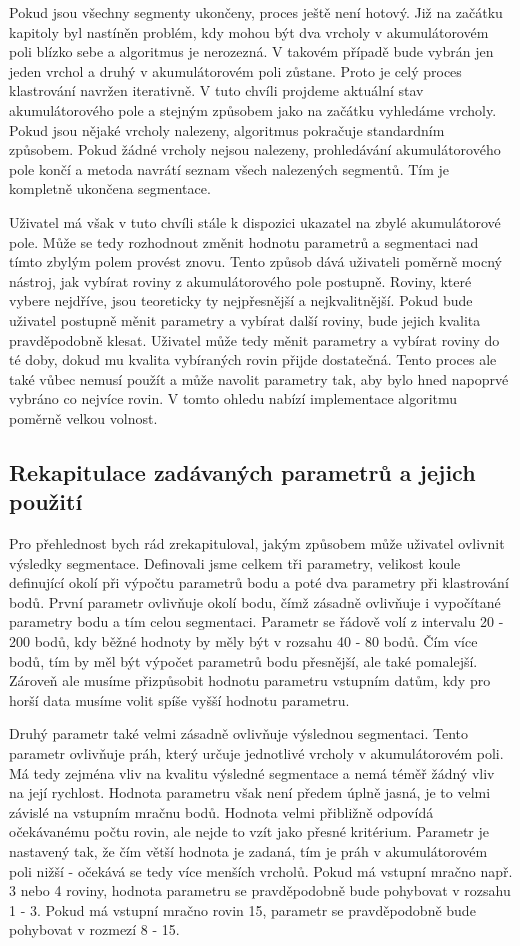 \documentclass[11pt,twoside,a4paper]{book}
\begin{document}
Pokud jsou všechny segmenty ukončeny, proces ještě není hotový. Již na začátku kapitoly byl nastíněn problém, kdy mohou být dva vrcholy v akumulátorovém poli blízko sebe a algoritmus je nerozezná. V takovém případě bude vybrán jen jeden vrchol a druhý v akumulátorovém poli zůstane. Proto je celý proces klastrování navržen iterativně. V tuto chvíli projdeme aktuální stav akumulátorového pole a stejným způsobem jako na začátku vyhledáme vrcholy. Pokud jsou nějaké vrcholy nalezeny, algoritmus pokračuje standardním způsobem. Pokud žádné vrcholy nejsou nalezeny, prohledávání akumulátorového pole končí a metoda navrátí seznam všech nalezených segmentů. Tím je kompletně ukončena segmentace. 

Uživatel má však v tuto chvíli stále k dispozici ukazatel na zbylé akumulátorové pole. Může se tedy rozhodnout změnit hodnotu parametrů a segmentaci nad tímto zbylým polem provést znovu. Tento způsob dává uživateli poměrně mocný nástroj, jak vybírat roviny z akumulátorového pole postupně. Roviny, které vybere nejdříve, jsou teoreticky ty nejpřesnější a nejkvalitnější. Pokud bude uživatel postupně měnit parametry a vybírat další roviny, bude jejich kvalita pravděpodobně klesat. Uživatel může tedy měnit parametry a vybírat roviny do té doby, dokud mu kvalita vybíraných rovin přijde dostatečná. Tento proces ale také vůbec nemusí použít a může navolit parametry tak, aby bylo hned napoprvé vybráno co nejvíce rovin. V tomto ohledu nabízí implementace algoritmu poměrně velkou volnost.


\subsection{Rekapitulace zadávaných parametrů a jejich použití}
\label{sub:param}

Pro přehlednost bych rád zrekapituloval, jakým způsobem může uživatel ovlivnit výsledky segmentace. Definovali jsme celkem tři parametry, velikost koule definující okolí při výpočtu parametrů bodu a poté dva parametry při klastrování bodů. První parametr ovlivňuje okolí bodu, čímž zásadně ovlivňuje i vypočítané parametry bodu a tím celou segmentaci. Parametr se řádově volí z intervalu 20 - 200 bodů, kdy běžné hodnoty by měly být v rozsahu 40 - 80 bodů. Čím více bodů, tím by měl být výpočet parametrů bodu přesnější, ale také pomalejší. Zároveň ale musíme přizpůsobit hodnotu parametru vstupním datům, kdy pro horší data musíme volit spíše vyšší hodnotu parametru. 

Druhý parametr také velmi zásadně ovlivňuje výslednou segmentaci. Tento parametr ovlivňuje práh, který určuje jednotlivé vrcholy v akumulátorovém poli. Má tedy zejména vliv na kvalitu výsledné segmentace a nemá téměř žádný vliv na její rychlost. Hodnota parametru však není předem úplně jasná, je to velmi závislé na vstupním mračnu bodů. Hodnota velmi přibližně odpovídá očekávanému počtu rovin, ale nejde to vzít jako přesné kritérium. Parametr je nastavený tak, že čím větší hodnota je zadaná, tím je práh v akumulátorovém poli nižší - očekává se tedy více menších vrcholů. Pokud má vstupní mračno např. 3 nebo 4 roviny, hodnota parametru se pravděpodobně bude pohybovat v rozsahu 1 - 3. Pokud má vstupní mračno rovin 15, parametr se pravděpodobně bude pohybovat v rozmezí 8 - 15.
\end{document}
